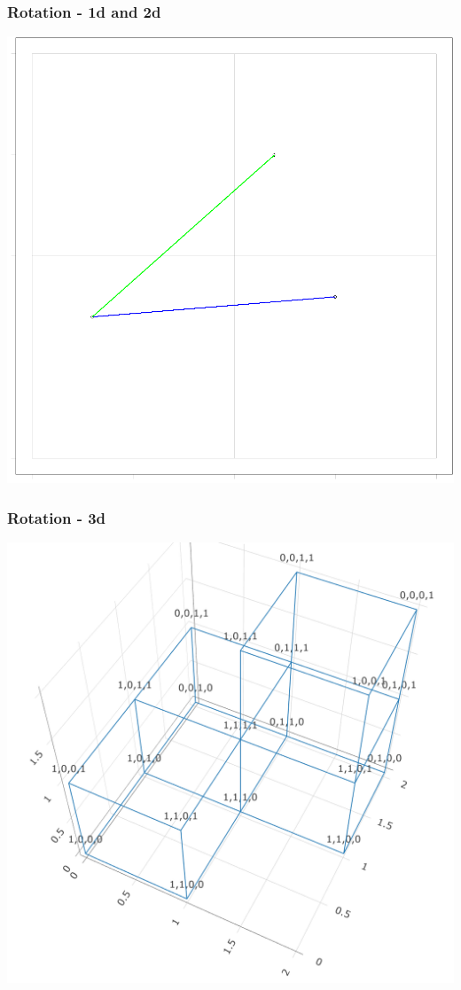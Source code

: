 \documentclass[aspectratio=169]{beamer}
\newlength{\frametextheight}
\begin{document}
\begin{frame}
    \frametitle{Rotation - 1d and 2d}
    \begin{center}
        \includegraphics[height = \frametextheight]{./images/rot_3d_2d}
    \end{center}
\end{frame}

\begin{frame}
    \frametitle{Rotation - 3d}
    \begin{center}
        \includegraphics[height=\frametextheight]{./images/rot_4d_3d}
    \end{center}
\end{frame}
\end{document}
